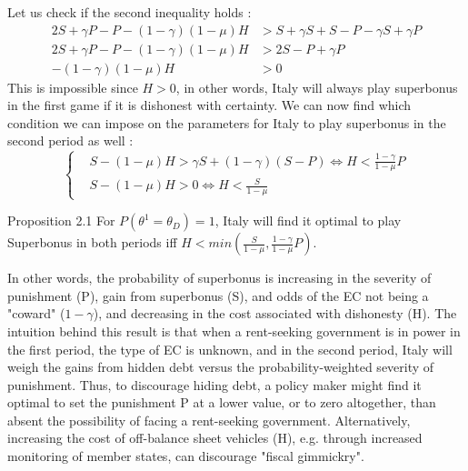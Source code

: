 \documentclass{article}
\begin{document}
Let us check if the second inequality holds : 
\begin{equation}
\begin{aligned}
    2S+\gamma P-P-(1-\gamma)(1-\mu)H&>S+\gamma S+S-P-\gamma S+\gamma P\\
    2S+\gamma P-P-(1-\gamma)(1-\mu)H &> 2S-P+\gamma P\\
    -(1-\gamma)(1-\mu)H&>0
\end{aligned}
\end{equation}
This is impossible since $H>0$, in other words, Italy will always play superbonus in the first game if it is dishonest with certainty. We can now find which condition we can impose on the parameters for Italy to play superbonus in the second period as well : 
\begin{equation}
\left\{
\begin{aligned}
    &S-(1-\mu) H>\gamma S+(1-\gamma)(S-P) \Leftrightarrow H<\frac{1-\gamma}{1-\mu}P\\
    &S-(1-\mu) H>0\Leftrightarrow H<\frac{S}{1-\mu}
\end{aligned}
\right.
\end{equation}
\begin{simplebox}{Proposition 2.1}
    For $P(\theta^1=\theta_D)=1$, Italy will find it optimal to play Superbonus in both periods iff   $H<min(\frac{S}{1-\mu},\frac{1-\gamma}{1-\mu}P)$.
\end{simplebox}

In other words, the probability of superbonus is increasing in the severity of punishment (P), gain from superbonus (S), and odds of the EC not being a "coward" ($1-\gamma$), and decreasing in the cost associated with dishonesty (H). The intuition behind this result is that when a rent-seeking government is in power in the first period, the type of EC is unknown, and in the second period, Italy will weigh the gains from hidden debt versus the probability-weighted severity of punishment. Thus, to discourage hiding debt, a policy maker might find it optimal to set the punishment P at a lower value, or to zero altogether, than absent the possibility of facing a rent-seeking government. Alternatively, increasing the cost of off-balance sheet vehicles (H), e.g. through increased monitoring of member states, can discourage "fiscal gimmickry".  
\end{document}
